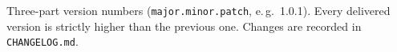 
Three-part version numbers (\texttt{major.minor.patch}, e.\,g.\ 1.0.1).
Every delivered version is strictly higher than the previous one.
Changes are recorded in \texttt{CHANGELOG.md}.
